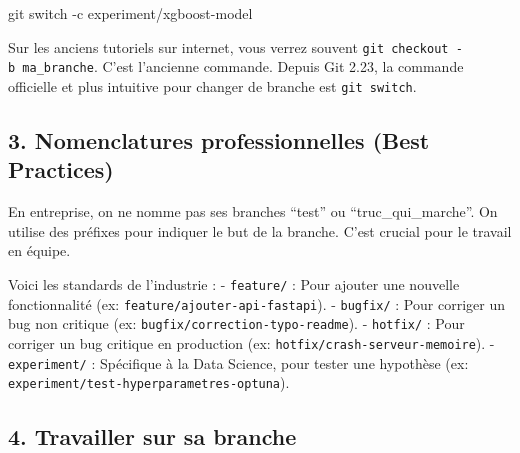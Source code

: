 \documentclass[
  letterpaper,
  DIV=11,
  numbers=noendperiod]{scrreprt}
\newenvironment{Shaded}{\begin{snugshade}}{\end{snugshade}}
\newcommand{\AttributeTok}[1]{\textcolor[rgb]{0.40,0.45,0.13}{#1}}
\newcommand{\FunctionTok}[1]{\textcolor[rgb]{0.28,0.35,0.67}{#1}}
\newcommand{\NormalTok}[1]{\textcolor[rgb]{0.00,0.23,0.31}{#1}}
\begin{document}
\begin{Shaded}
\begin{Highlighting}[]
\FunctionTok{git}\NormalTok{ switch }\AttributeTok{{-}c}\NormalTok{ experiment/xgboost{-}model}
\end{Highlighting}
\end{Shaded}

\begin{tcolorbox}[enhanced jigsaw, arc=.35mm, bottomrule=.15mm, bottomtitle=1mm, breakable, colback=white, colbacktitle=quarto-callout-note-color!10!white, colframe=quarto-callout-note-color-frame, coltitle=black, left=2mm, leftrule=.75mm, opacityback=0, opacitybacktitle=0.6, rightrule=.15mm, title=\textcolor{quarto-callout-note-color}{\faInfo}\hspace{0.5em}{\texttt{switch} vs \texttt{checkout}}, titlerule=0mm, toprule=.15mm, toptitle=1mm]

Sur les anciens tutoriels sur internet, vous verrez souvent
\texttt{git\ checkout\ -b\ ma\_branche}. C'est l'ancienne commande.
Depuis Git 2.23, la commande officielle et plus intuitive pour changer
de branche est \texttt{git\ switch}.

\end{tcolorbox}

\subsection{3. Nomenclatures professionnelles (Best
Practices)}\label{nomenclatures-professionnelles-best-practices}

En entreprise, on ne nomme pas ses branches ``test'' ou
``truc\_qui\_marche''. On utilise des préfixes pour indiquer le but de
la branche. C'est crucial pour le travail en équipe.

Voici les standards de l'industrie : - \texttt{feature/} : Pour ajouter
une nouvelle fonctionnalité (ex: \texttt{feature/ajouter-api-fastapi}).
- \texttt{bugfix/} : Pour corriger un bug non critique (ex:
\texttt{bugfix/correction-typo-readme}). - \texttt{hotfix/} : Pour
corriger un bug critique en production (ex:
\texttt{hotfix/crash-serveur-memoire}). - \texttt{experiment/} :
Spécifique à la Data Science, pour tester une hypothèse (ex:
\texttt{experiment/test-hyperparametres-optuna}).

\subsection{4. Travailler sur sa
branche}\label{travailler-sur-sa-branche}
\end{document}
